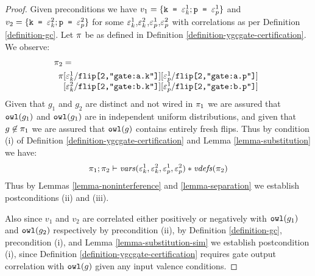 \begin{proof}
  Given preconditions we have $v_1 =  \{ \texttt{k = }\varepsilon^1_{k}; \texttt{p = }\varepsilon^1_{p} \}$ and
  $v_2 = \{ \texttt{k = }\varepsilon^2_{k}; \texttt{p = }\varepsilon^2_{p} \}$ for some
  $\varepsilon^1_{k}$,$\varepsilon^2_{k}$,$\varepsilon^1_{p}$,$\varepsilon^2_{p}$ with correlations as per Definition
  \ref{definition-gc}.
  Let $\pi$ be as defined in Definition \ref{definition-ygcgate-certification}.
  We observe:
  \begin{eqnarray*}
    &\prog_2 = \\
    &\begin{array}{l}\prog[\be^1_{k}/\ttt{flip[2,"gate:a.k"]}][\be^1_{p}/\ttt{flip[2,"gate:a.p"]}]\\
       \phantom{\prog}[\be^2_{k}/\ttt{flip[2,"gate:b.k"]}][\be^1_{p}/\ttt{flip[2,"gate:b.p"]}]\end{array}
  \end{eqnarray*}
  Given that $g_1$ and $g_2$ are distinct and not wired in $\pi_1$
  we are assured that $\texttt{owl}(g_1)$ and $\texttt{owl}(g_1)$ are in
  independent uniform distributions, and given that $g \not\in
  \pi_1$ we are assured that $\texttt{owl}(g)$ contains entirely fresh
  flips. Thus by condition (i) of Definition \ref{definition-ygcgate-certification} and
  Lemma \ref{lemma-substitution} we have:
  $$
  \pi_1;\pi_2 \vdash \mathit{vars}(\varepsilon^1_{k},\varepsilon^2_{k},\varepsilon^1_{p},\varepsilon^2_{p}) * \mathit{vdefs}(\pi_2)
  $$
  Thus by Lemmas \ref{lemma-noninterference} and \ref{lemma-separation} we establish
  postconditions (ii) and (iii).

  Also since $v_1$ and $v_2$ are correlated either positively or negatively with
  $\texttt{owl}(g_1)$ and $\texttt{owl}(g_2)$ respectively by precondition (ii),
  by Definition \ref{definition-gc}, precondition (i), and Lemma \ref{lemma-substitution-sim}
  we establish postcondition (i), since Definition \ref{definition-ygcgate-certification}
  requires gate output correlation with $\texttt{owl}(g)$ given any input valence conditions.
\end{proof}

\ygcencode*

